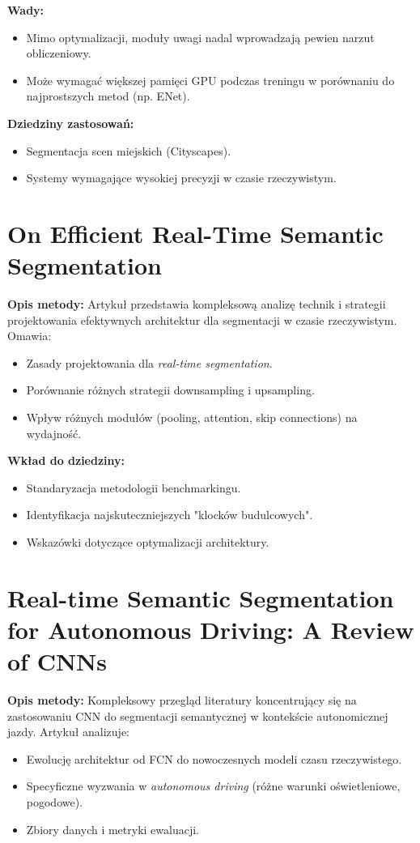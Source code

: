 \textbf{Wady:}
\begin{itemize}
    \item Mimo optymalizacji, moduły uwagi nadal wprowadzają pewien narzut obliczeniowy.
    \item Może wymagać większej pamięci GPU podczas treningu w porównaniu do najprostszych metod (np. ENet).
\end{itemize}

\textbf{Dziedziny zastosowań:}
\begin{itemize}
    \item Segmentacja scen miejskich (Cityscapes).
    \item Systemy wymagające wysokiej precyzji w czasie rzeczywistym.
\end{itemize}

\section{On Efficient Real-Time Semantic Segmentation}
\textbf{Opis metody:}
Artykuł przedstawia kompleksową analizę technik i strategii projektowania efektywnych architektur dla segmentacji w czasie rzeczywistym. Omawia:
\begin{itemize}
    \item Zasady projektowania dla \textit{real-time segmentation}.
    \item Porównanie różnych strategii downsampling i upsampling.
    \item Wpływ różnych modułów (pooling, attention, skip connections) na wydajność.
\end{itemize}

\textbf{Wkład do dziedziny:}
\begin{itemize}
    \item Standaryzacja metodologii benchmarkingu.
    \item Identyfikacja najskuteczniejszych "klocków budulcowych".
    \item Wskazówki dotyczące optymalizacji architektury.
\end{itemize}

\section{Real-time Semantic Segmentation for Autonomous Driving: A Review of CNNs}
\textbf{Opis metody:}
Kompleksowy przegląd literatury koncentrujący się na zastosowaniu CNN do segmentacji semantycznej w kontekście autonomicznej jazdy. Artykuł analizuje:
\begin{itemize}
    \item Ewolucję architektur od FCN do nowoczesnych modeli czasu rzeczywistego.
    \item Specyficzne wyzwania w \textit{autonomous driving} (różne warunki oświetleniowe, pogodowe).
    \item Zbiory danych i metryki ewaluacji.
\end{itemize}

